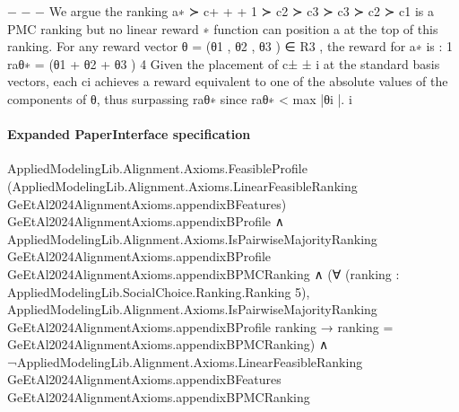 \documentclass[10pt]{article}
\begin{document}
\begin{ReviewVerbatim}
                                                −   − −
We argue the ranking a∗ ≻ c+       +      +
                             1 ≻ c2 ≻ c3 ≻ c3 ≻ c2 ≻ c1 is a PMC ranking but no linear reward
                       ∗
function can position a at the top of this ranking.
For any reward vector θ = (θ1 , θ2 , θ3 ) ∈ R3 , the reward for a∗ is :
                                                     1
                                         raθ∗ =        (θ1 + θ2 + θ3 )
                                                     4
Given the placement of c±                                        ±
                          i at the standard basis vectors, each ci achieves a reward equivalent to one
of the absolute values of the components of θ, thus surpassing raθ∗ since
                                                  raθ∗ < max |θi |.
                                                             i
\end{ReviewVerbatim}



\paragraph{Expanded PaperInterface specification}
\begin{ReviewVerbatim}
AppliedModelingLib.Alignment.Axioms.FeasibleProfile
    (AppliedModelingLib.Alignment.Axioms.LinearFeasibleRanking GeEtAl2024AlignmentAxioms.appendixBFeatures)
    GeEtAl2024AlignmentAxioms.appendixBProfile ∧
  AppliedModelingLib.Alignment.Axioms.IsPairwiseMajorityRanking GeEtAl2024AlignmentAxioms.appendixBProfile
      GeEtAl2024AlignmentAxioms.appendixBPMCRanking ∧
    (∀ (ranking : AppliedModelingLib.SocialChoice.Ranking.Ranking 5),
        AppliedModelingLib.Alignment.Axioms.IsPairwiseMajorityRanking GeEtAl2024AlignmentAxioms.appendixBProfile
            ranking →
          ranking = GeEtAl2024AlignmentAxioms.appendixBPMCRanking) ∧
      ¬AppliedModelingLib.Alignment.Axioms.LinearFeasibleRanking GeEtAl2024AlignmentAxioms.appendixBFeatures
          GeEtAl2024AlignmentAxioms.appendixBPMCRanking
\end{ReviewVerbatim}
\end{document}
